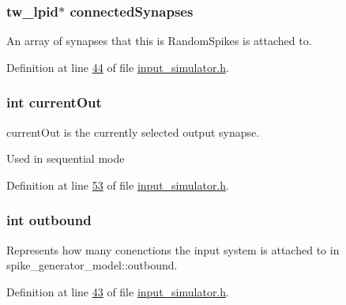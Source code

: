 \subsubsection[{connected\+Synapses}]{\setlength{\rightskip}{0pt plus 5cm}tw\+\_\+lpid$\ast$ connected\+Synapses}\label{structinput_simulator_state_a569dc67b8984bb0a3616bf17f9763ebb}


An array of synapses that this is Random\+Spikes is attached to. 



Definition at line \hyperlink{input__simulator_8h_source_l00044}{44} of file \hyperlink{input__simulator_8h_source}{input\+\_\+simulator.\+h}.

\hypertarget{structinput_simulator_state_accc0c3f890194cda401a16f5f54e43cb}{}
\subsubsection[{current\+Out}]{\setlength{\rightskip}{0pt plus 5cm}int current\+Out}\label{structinput_simulator_state_accc0c3f890194cda401a16f5f54e43cb}


current\+Out is the currently selected output synapse. 

Used in sequential mode 

Definition at line \hyperlink{input__simulator_8h_source_l00053}{53} of file \hyperlink{input__simulator_8h_source}{input\+\_\+simulator.\+h}.

\hypertarget{structinput_simulator_state_af892db49cef1c5e5d95010561e549678}{}
\subsubsection[{outbound}]{\setlength{\rightskip}{0pt plus 5cm}int outbound}\label{structinput_simulator_state_af892db49cef1c5e5d95010561e549678}


Represents how many conenctions the input system is attached to in spike\+\_\+generator\+\_\+model\+::outbound. 



Definition at line \hyperlink{input__simulator_8h_source_l00043}{43} of file \hyperlink{input__simulator_8h_source}{input\+\_\+simulator.\+h}.

